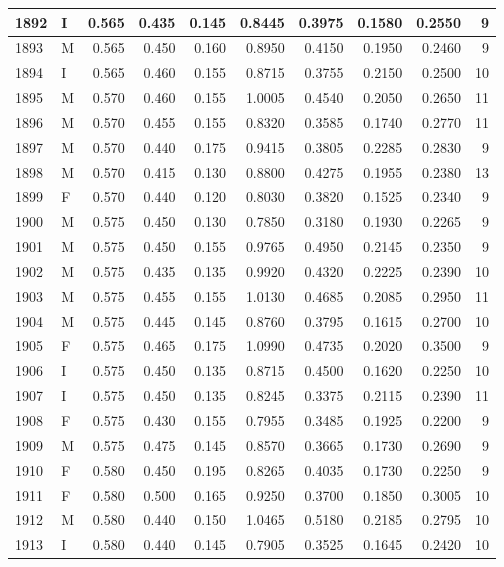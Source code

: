 \documentclass[9pt,twocolumn,twoside,]{pnas-new}
\begin{document}
\begin{tabular}{l|l|r|r|r|r|r|r|r|r}
\hline
1892 & I & 0.565 & 0.435 & 0.145 & 0.8445 & 0.3975 & 0.1580 & 0.2550 & 9\\
\hline
1893 & M & 0.565 & 0.450 & 0.160 & 0.8950 & 0.4150 & 0.1950 & 0.2460 & 9\\
\hline
1894 & I & 0.565 & 0.460 & 0.155 & 0.8715 & 0.3755 & 0.2150 & 0.2500 & 10\\
\hline
1895 & M & 0.570 & 0.460 & 0.155 & 1.0005 & 0.4540 & 0.2050 & 0.2650 & 11\\
\hline
1896 & M & 0.570 & 0.455 & 0.155 & 0.8320 & 0.3585 & 0.1740 & 0.2770 & 11\\
\hline
1897 & M & 0.570 & 0.440 & 0.175 & 0.9415 & 0.3805 & 0.2285 & 0.2830 & 9\\
\hline
1898 & M & 0.570 & 0.415 & 0.130 & 0.8800 & 0.4275 & 0.1955 & 0.2380 & 13\\
\hline
1899 & F & 0.570 & 0.440 & 0.120 & 0.8030 & 0.3820 & 0.1525 & 0.2340 & 9\\
\hline
1900 & M & 0.575 & 0.450 & 0.130 & 0.7850 & 0.3180 & 0.1930 & 0.2265 & 9\\
\hline
1901 & M & 0.575 & 0.450 & 0.155 & 0.9765 & 0.4950 & 0.2145 & 0.2350 & 9\\
\hline
1902 & M & 0.575 & 0.435 & 0.135 & 0.9920 & 0.4320 & 0.2225 & 0.2390 & 10\\
\hline
1903 & M & 0.575 & 0.455 & 0.155 & 1.0130 & 0.4685 & 0.2085 & 0.2950 & 11\\
\hline
1904 & M & 0.575 & 0.445 & 0.145 & 0.8760 & 0.3795 & 0.1615 & 0.2700 & 10\\
\hline
1905 & F & 0.575 & 0.465 & 0.175 & 1.0990 & 0.4735 & 0.2020 & 0.3500 & 9\\
\hline
1906 & I & 0.575 & 0.450 & 0.135 & 0.8715 & 0.4500 & 0.1620 & 0.2250 & 10\\
\hline
1907 & I & 0.575 & 0.450 & 0.135 & 0.8245 & 0.3375 & 0.2115 & 0.2390 & 11\\
\hline
1908 & F & 0.575 & 0.430 & 0.155 & 0.7955 & 0.3485 & 0.1925 & 0.2200 & 9\\
\hline
1909 & M & 0.575 & 0.475 & 0.145 & 0.8570 & 0.3665 & 0.1730 & 0.2690 & 9\\
\hline
1910 & F & 0.580 & 0.450 & 0.195 & 0.8265 & 0.4035 & 0.1730 & 0.2250 & 9\\
\hline
1911 & F & 0.580 & 0.500 & 0.165 & 0.9250 & 0.3700 & 0.1850 & 0.3005 & 10\\
\hline
1912 & M & 0.580 & 0.440 & 0.150 & 1.0465 & 0.5180 & 0.2185 & 0.2795 & 10\\
\hline
1913 & I & 0.580 & 0.440 & 0.145 & 0.7905 & 0.3525 & 0.1645 & 0.2420 & 10\\

\end{tabular}
\end{document}

